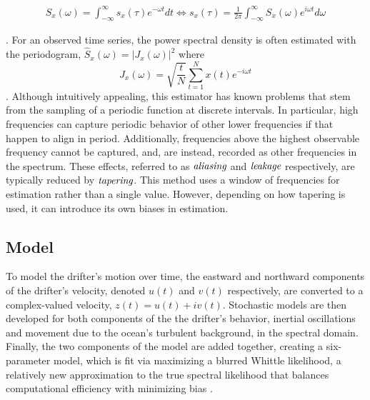 \documentclass{stat572Style}
\begin{document}
\begin{align*}
S_{x}(\omega) = \int_{-\infty}^{\infty}s_{x}(\tau) e^{-\omega t}dt  \Longleftrightarrow s_{x}(\tau) = \frac{1}{2\pi} \int_{-\infty}^{\infty}S_{x}(\omega) e^{i \omega t} d\omega 
\end{align*}

\noindent \citep{Sykulski2013}. For an observed time series, the power spectral density is often estimated with the periodogram, $\hat{S}_{x}(\omega) = |J_{x}(\omega)|^{2}$ where 
\begin{equation}
J_{x}(\omega) = \sqrt{\frac{t}{N}} \sum_{t=1}^{N} x(t) e^{-i \omega t}
\end{equation}
\citep{Sykulski2013}. Although intuitively appealing, this estimator has known problems that stem from the sampling of a periodic function at discrete intervals. In particular,  high frequencies can  capture periodic behavior of other lower frequencies if that happen to align in period. Additionally, frequencies above the highest observable frequency cannot be captured, and, are instead, recorded as other frequencies in the spectrum.  These effects, referred to as $\textbf{\it{aliasing}}$ and $\textbf{\it{leakage}}$ respectively,  are typically reduced by $\textbf{\it{tapering}}$. This method uses  a window of frequencies for estimation rather than a single value. However, depending on how tapering is used, it can introduce its own  biases in estimation.  


\subsection{Model}
 To model the drifter's motion over time, the eastward and northward components of the drifter's velocity, denoted $u(t)$ and $v(t)$ respectively, are converted to a complex-valued velocity, $z(t) = u(t) + iv(t)$. Stochastic models are then developed for both components of the the drifter's behavior, inertial oscillations and movement due to the ocean's turbulent background,  in the spectral domain. Finally, the two components of the model are added together, creating a six-parameter model, which is fit via maximizing a blurred Whittle likelihood, a relatively new approximation to the true spectral likelihood that balances computational efficiency with minimizing bias \citep{Sykulski2013}. 
 
\end{document}

